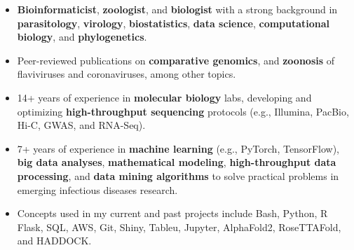 \documentclass[11pt, letterpaper, sans]{moderncv}
\begin{document}
    \thispagestyle{empty}
    \maketitle


\vspace{-4.5em}

\begin{itemize}[itemsep=0in, labelindent=0in, leftmargin=*]


\item \textbf{Bioinformaticist}, \textbf{zoologist}, and \textbf{biologist} with a strong background in \textbf{parasitology}, \textbf{virology}, \textbf{biostatistics}, \textbf{data science}, \textbf{computational biology}, and \textbf{phylogenetics}.

\item Peer-reviewed publications on \textbf{comparative genomics}, and \textbf{zoonosis} of flaviviruses and coronaviruses, among other topics.

\item 14+ years of experience in \textbf{molecular biology} labs, developing and optimizing \textbf{high-throughput sequencing} protocols (e.g., Illumina, PacBio, Hi-C, GWAS, and RNA-Seq).

\item 7+ years of experience in \textbf{machine learning} (e.g., PyTorch, TensorFlow), \textbf{big data analyses}, \textbf{mathematical modeling}, \textbf{high-throughput data processing}, and \textbf{data mining algorithms} to solve practical problems in emerging infectious diseases research.

\item Concepts used in my current and past projects include Bash, Python, R Flask, SQL, AWS, Git, Shiny, Tableu, Jupyter, AlphaFold2, RoseTTAFold, and HADDOCK.

\end{itemize}
\end{document}
